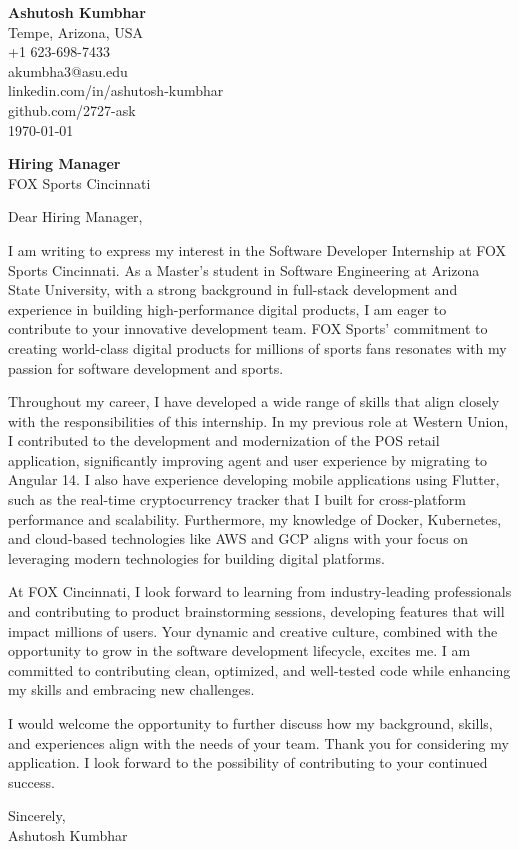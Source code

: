 \documentclass[11pt]{article}
\begin{document}
\begin{flushleft}
\textbf{Ashutosh Kumbhar} \\
Tempe, Arizona, USA \\
+1 623-698-7433 \\
akumbha3@asu.edu \\
linkedin.com/in/ashutosh-kumbhar \\
github.com/2727-ask \\
\today
\end{flushleft}

\vspace{0.5em}
\textbf{Hiring Manager} \\
FOX Sports Cincinnati \\

\vspace{1em}

Dear Hiring Manager,

I am writing to express my interest in the Software Developer Internship at FOX Sports Cincinnati. As a Master's student in Software Engineering at Arizona State University, with a strong background in full-stack development and experience in building high-performance digital products, I am eager to contribute to your innovative development team. FOX Sports' commitment to creating world-class digital products for millions of sports fans resonates with my passion for software development and sports.

Throughout my career, I have developed a wide range of skills that align closely with the responsibilities of this internship. In my previous role at Western Union, I contributed to the development and modernization of the POS retail application, significantly improving agent and user experience by migrating to Angular 14. I also have experience developing mobile applications using Flutter, such as the real-time cryptocurrency tracker that I built for cross-platform performance and scalability. Furthermore, my knowledge of Docker, Kubernetes, and cloud-based technologies like AWS and GCP aligns with your focus on leveraging modern technologies for building digital platforms.

At FOX Cincinnati, I look forward to learning from industry-leading professionals and contributing to product brainstorming sessions, developing features that will impact millions of users. Your dynamic and creative culture, combined with the opportunity to grow in the software development lifecycle, excites me. I am committed to contributing clean, optimized, and well-tested code while enhancing my skills and embracing new challenges.

I would welcome the opportunity to further discuss how my background, skills, and experiences align with the needs of your team. Thank you for considering my application. I look forward to the possibility of contributing to your continued success.

Sincerely, \\
Ashutosh Kumbhar
\end{document}
